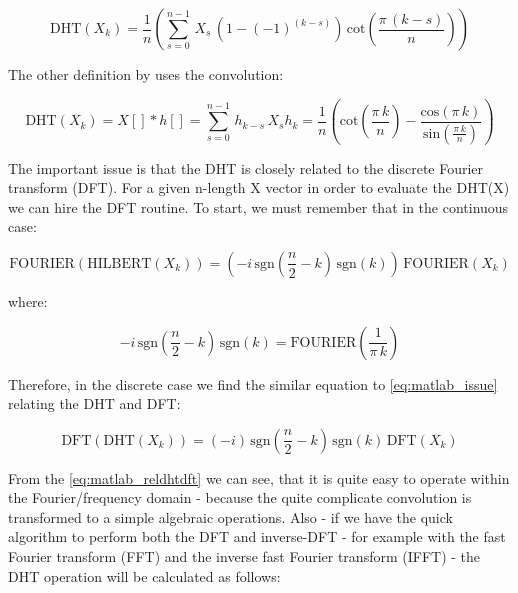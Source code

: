 \documentclass[12pt,twoside,a4paper]{article}
\numberwithin{equation}{subsection}
\numberwithin{figure}{subsection}
\begin{document}
\begin{equation} \label{eq:matlab_fhttheroy}
  \mathrm{DHT}({X_{k}})=\frac {1}{n} \left(  \! \sum_{s=0}^{n - 1}\,{X _{s}}\,(1 - ( - 1)^{(k - s)})\,\mathrm{cot}(\frac {\pi \,(k
  - s) }{n}) \!  \right) 
\end{equation}

The other definition by \cite{calvetti_computation} uses the convolution:

\begin{subequations} \label{eq:matlab_convolution}
  \begin{equation}   \label{eq:mconv_dht}
    \mathrm{DHT}({X_{k}})  = X[] * h[] = \sum_{s=0}^{n - 1}\,{h_{k - s}}\,{X_{s}}
  \end{equation}
  \begin{equation}   \label{eq:mconv_hk}
    {h_{k}}=\frac {1}{n} \left(  \! \mathrm{cot}(\frac {\pi \,k}{n}) - \frac {\mathrm{cos}(\pi \,k)}{\mathrm{sin}(\frac {\pi
    \,k}{n})}\! \right) 
  \end{equation}
\end{subequations}

The important issue is that the DHT is closely related to the discrete Fourier transform (DFT). For a given n-length X vector in
order to evaluate the DHT(X) we can hire the DFT routine. To start, we must remember that in the continuous case:

\begin{equation} \label{eq:matlab_issue}
  \mathrm{FOURIER}(\mathrm{HILBERT}({X_{k}}))=( - i\,\mathrm{sgn}( \frac {n}{2} - k)\,\mathrm{sgn}(k))\,\mathrm{FOURIER}({X_{k}})
\end{equation}

where:

\begin{equation} \label{eq:matlab_kernel}
   - i\,\mathrm{sgn}(\frac {n}{2} - k)\,\mathrm{sgn}(k)=\mathrm{FOURIER}(\frac {1}{\pi \,k})
\end{equation}

Therefore, in the discrete case we find the similar equation to \ref{eq:matlab_issue} relating the DHT and DFT:

\begin{equation} \label{eq:matlab_reldhtdft}
  \mathrm{DFT}(\mathrm{DHT}({X_{k}}))=( - i)\,\mathrm{sgn}(\frac {n}{2} - k)\,\mathrm{sgn}(k)\,\mathrm{DFT}({X_{k}})
\end{equation}

From the \ref{eq:matlab_reldhtdft} we can see, that it is quite easy to operate within the Fourier/frequency domain - because the
quite complicate convolution is transformed to a simple algebraic operations. Also - if we have the quick algorithm to perform both
the DFT and inverse-DFT - for example with the fast Fourier transform (FFT) and the inverse fast Fourier transform (IFFT) - the DHT
operation will be calculated as follows:
\end{document}
